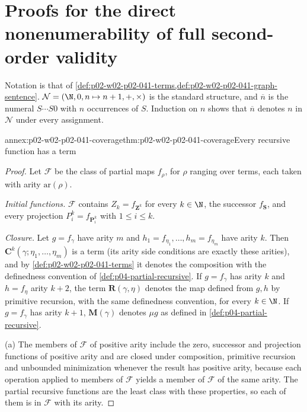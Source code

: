 \section{Proofs for the direct nonenumerability of full second-order validity}
\label{sec:annex-p02-w02-p02-041}

Notation is that of
\cref{def:p02-w02-p02-041-terms,def:p02-w02-p02-041-graph-sentence}.
\(\mathcal N=(\N,0,n\mapsto n+1,+,\times)\) is the standard structure, and
\(\overline n\) is the numeral \(S\cdots S0\) with \(n\) occurrences of \(S\).
Induction on \(n\) shows that \(\overline n\) denotes \(n\) in \(\mathcal N\)
under every assignment.

\begin{annexitem}{annex:p02-w02-p02-041-coverage}{thm:p02-w02-p02-041-coverage}{Every recursive function has a term}
\begin{proof}
Let \(\mathcal F\) be the class of partial maps \(f_\rho\), for \(\rho\)
ranging over terms, each taken with arity \(\mathrm{ar}(\rho)\).

\emph{Initial functions.}  \(\mathcal F\) contains \(Z_k=f_{\mathbf Z^k}\) for
every \(k\in\N\), the successor \(f_{\mathbf S}\), and every projection
\(P^k_i=f_{\mathbf P^k_i}\) with \(1\le i\le k\).

\emph{Closure.}  Let \(g=f_\gamma\) have arity \(m\) and
\(h_1=f_{\eta_1},\ldots,h_m=f_{\eta_m}\) have arity \(k\).  Then
\(\mathbf C^k(\gamma;\eta_1,\ldots,\eta_m)\) is a term (its arity side
conditions are exactly these arities), and by
\cref{def:p02-w02-p02-041-terms} it denotes the composition with the
definedness convention of \cref{def:p04-partial-recursive}.  If
\(g=f_\gamma\) has arity \(k\) and \(h=f_\eta\) arity \(k+2\), the term
\(\mathbf R(\gamma,\eta)\) denotes the map defined from \(g,h\) by primitive
recursion, with the same definedness convention, for every \(k\in\N\).  If
\(g=f_\gamma\) has arity \(k+1\), \(\mathbf M(\gamma)\) denotes
\(\mu g\) as defined in \cref{def:p04-partial-recursive}.

(a) The members of \(\mathcal F\) of positive arity include the zero,
successor and projection functions of positive arity and are closed under
composition, primitive recursion and unbounded minimization whenever the
result has positive arity, because each operation applied to members of
\(\mathcal F\) yields a member of \(\mathcal F\) of the same arity.  The
partial recursive functions are the least class with these properties, so
each of them is in \(\mathcal F\) with its arity.


\end{proof}
\end{annexitem}
